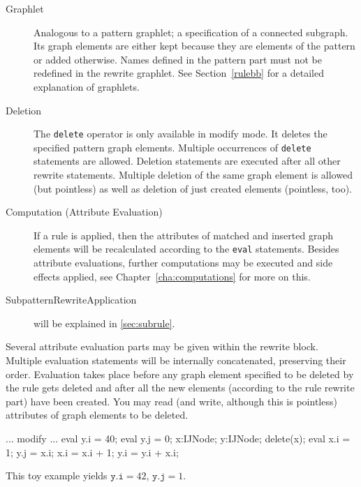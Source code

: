 \begin{description}
  \item[Graphlet] Analogous to a pattern graphlet; a specification of a connected subgraph. Its graph elements are either kept because they are elements of the pattern or added otherwise. Names defined in the pattern part must not be redefined in the rewrite graphlet. See Section~\ref{rulebb} for a detailed explanation of graphlets.
  \item[Deletion] The \texttt{delete} operator is only available in modify mode. It deletes the specified pattern graph elements. Multiple occurrences of \texttt{delete} statements are allowed. Deletion statements are executed after all other rewrite statements. Multiple deletion of the same graph element is allowed (but pointless) as well as deletion of just created elements (pointless, too).
  \item[Computation (Attribute Evaluation)] If a rule is applied, then the attributes of matched and inserted graph elements will be recalculated according to the \texttt{eval} statements. Besides attribute evaluations, further computations may be executed and side effects applied, see Chapter~\ref{cha:computations} for more on this.
  \item[SubpatternRewriteApplication] will be explained in \ref{sec:subrule}.
\end{description}

Several attribute evaluation parts may be given within the rewrite block.
Multiple evaluation statements will be internally concatenated, preserving their order.
Evaluation takes place before any graph element specified to be deleted by the rule gets deleted and after all the new elements (according to the rule rewrite part) have been created.
You may read (and write, although this is pointless) attributes of graph elements to be deleted.

\begin{example}
\begin{grgen}
...
modify {
  ...
  eval { y.i = 40; }
  eval { y.j = 0;  }
  x:IJNode;
  y:IJNode;
  delete(x);
  eval {
    x.i = 1;
    y.j = x.i;
    x.i = x.i + 1;
    y.i = y.i + x.i;
  }
}
\end{grgen}
This toy example yields $\texttt{y.i} = 42$, $\texttt{y.j} = 1$.
\end{example}

